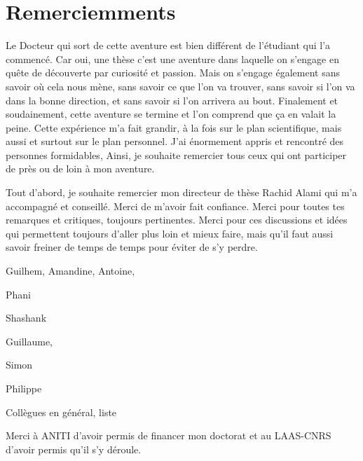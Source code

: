 \section*{Remerciemments}
 




Le Docteur qui sort de cette aventure est bien différent de l'étudiant qui l'a commencé. Car oui, une thèse c'est une aventure dans laquelle on s'engage en quête de découverte par curiosité et passion.
Mais on s'engage également sans savoir où cela nous mène, sans savoir ce que l'on va trouver, sans savoir si l'on va dans la bonne direction, et sans savoir si l'on arrivera au bout.
Finalement et soudainement, cette aventure se termine et l'on comprend que ça en valait la peine. 
Cette expérience m'a fait grandir, à la fois sur le plan scientifique, mais aussi et surtout sur le plan personnel.
J'ai énormement appris et rencontré des personnes formidables,  
Ainsi, je souhaite remercier tous ceux qui ont participer de près ou de loin à mon aventure.

Tout d'abord, je souhaite remercier mon directeur de thèse Rachid Alami qui m'a accompagné et conseillé. Merci de m'avoir fait confiance. 
Merci pour toutes tes remarques et critiques, toujours pertinentes. 
Merci pour ces discussions et idées qui permettent toujours d'aller plus loin et mieux faire, mais qu'il faut aussi savoir freiner de temps de temps pour éviter de s'y perdre.


Guilhem, Amandine, Antoine, 

Phani

Shashank

Guillaume,

Simon

Philippe 

Collègues en général, liste



Merci à ANITI d'avoir permis de financer mon doctorat et au LAAS-CNRS d'avoir permis qu'il s'y déroule.
